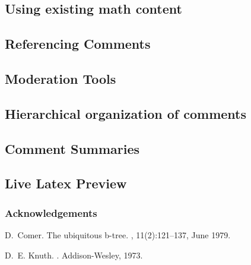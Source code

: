 \documentclass[a4paper]{article}
\begin{document}
\subsection{Using existing math content}

\subsection{Referencing Comments}

\subsection{Moderation Tools}

\subsection{Hierarchical organization of comments}

\subsection{Comment Summaries}

\subsection{Live Latex Preview}

\subsubsection*{Acknowledgements}


% 
%

\begin{thebibliography}{Com79}

D.~Comer.
\newblock The ubiquitous b-tree.
, 11(2):121--137, June 1979.

D.~E. Knuth.
.
\newblock Addison-Wesley, 1973.

\end{thebibliography}
\end{document}
